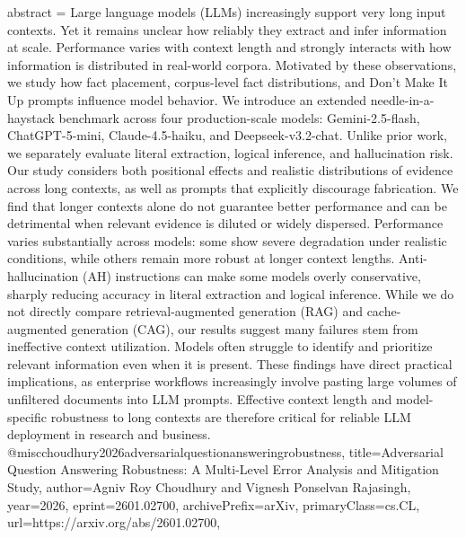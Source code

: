 {      abstract = {Large language models (LLMs) increasingly support very long input contexts. Yet it remains unclear how reliably they extract and infer information at scale. Performance varies with context length and strongly interacts with how information is distributed in real-world corpora. Motivated by these observations, we study how fact placement, corpus-level fact distributions, and Don't Make It Up prompts influence model behavior. We introduce an extended needle-in-a-haystack benchmark across four production-scale models: Gemini-2.5-flash, ChatGPT-5-mini, Claude-4.5-haiku, and Deepseek-v3.2-chat. Unlike prior work, we separately evaluate literal extraction, logical inference, and hallucination risk. Our study considers both positional effects and realistic distributions of evidence across long contexts, as well as prompts that explicitly discourage fabrication. We find that longer contexts alone do not guarantee better performance and can be detrimental when relevant evidence is diluted or widely dispersed. Performance varies substantially across models: some show severe degradation under realistic conditions, while others remain more robust at longer context lengths. Anti-hallucination (AH) instructions can make some models overly conservative, sharply reducing accuracy in literal extraction and logical inference. While we do not directly compare retrieval-augmented generation (RAG) and cache-augmented generation (CAG), our results suggest many failures stem from ineffective context utilization. Models often struggle to identify and prioritize relevant information even when it is present. These findings have direct practical implications, as enterprise workflows increasingly involve pasting large volumes of unfiltered documents into LLM prompts. Effective context length and model-specific robustness to long contexts are therefore critical for reliable LLM deployment in research and business.}
}@misc{choudhury2026adversarialquestionansweringrobustness,
      title={Adversarial Question Answering Robustness: A Multi-Level Error Analysis and Mitigation Study}, 
      author={Agniv Roy Choudhury and Vignesh Ponselvan Rajasingh},
      year={2026},
      eprint={2601.02700},
      archivePrefix={arXiv},
      primaryClass={cs.CL},
      url={https://arxiv.org/abs/2601.02700},
}
